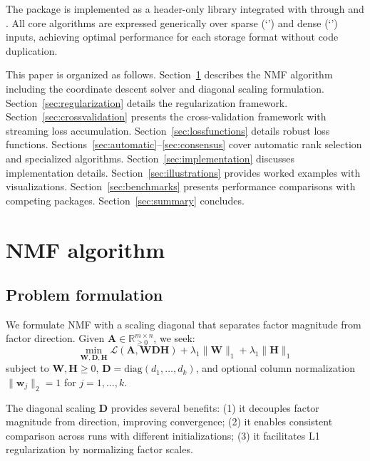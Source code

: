 \documentclass[article]{jss_modified}
\newcommand{\class}[1]{`\code{#1}'}
\begin{document}
The package is implemented as a header-only  library integrated 
with  through  \citep{Eddelbuettel2011, Eddelbuettel2013} 
and  \citep{Bates2013}. All core algorithms are expressed 
generically over sparse (\class{dgCMatrix}) and dense (\class{matrix}) inputs, 
achieving optimal performance for each storage format without code duplication.

This paper is organized as follows. Section~\ref{sec:algorithm} describes the 
NMF algorithm including the coordinate descent solver and diagonal scaling 
formulation. Section~\ref{sec:regularization} details the regularization 
framework. Section~\ref{sec:crossvalidation} presents the cross-validation 
framework with streaming loss accumulation. Section~\ref{sec:lossfunctions} 
details robust loss functions. Sections~\ref{sec:automatic}--\ref{sec:consensus} 
cover automatic rank selection and specialized algorithms. 
Section~\ref{sec:implementation} discusses implementation details. 
Section~\ref{sec:illustrations} provides worked examples with visualizations. 
Section~\ref{sec:benchmarks} presents performance comparisons with competing 
packages. Section~\ref{sec:summary} concludes.


\section{NMF algorithm} \label{sec:algorithm}

\subsection{Problem formulation}

We formulate NMF with a scaling diagonal that separates factor magnitude from 
factor direction. Given $\mathbf{A} \in \mathbb{R}_{\geq 0}^{m \times n}$, we 
seek:
\begin{equation}
  \min_{\mathbf{W}, \mathbf{D}, \mathbf{H}} 
  \mathcal{L}(\mathbf{A}, \mathbf{W}\mathbf{D}\mathbf{H}) + 
  \lambda_1 \|\mathbf{W}\|_1 + \lambda_1 \|\mathbf{H}\|_1
  \label{eq:objective}
\end{equation}
subject to $\mathbf{W}, \mathbf{H} \geq 0$, $\mathbf{D} = \text{diag}(d_1, 
\ldots, d_k)$, and optional column normalization $\|\mathbf{w}_j\|_2 = 1$ for 
$j = 1, \ldots, k$.

The diagonal scaling $\mathbf{D}$ provides several benefits: (1) it decouples 
factor magnitude from direction, improving convergence; (2) it enables 
consistent comparison across runs with different initializations; (3) it 
facilitates L1 regularization by normalizing factor scales.
\end{document}
